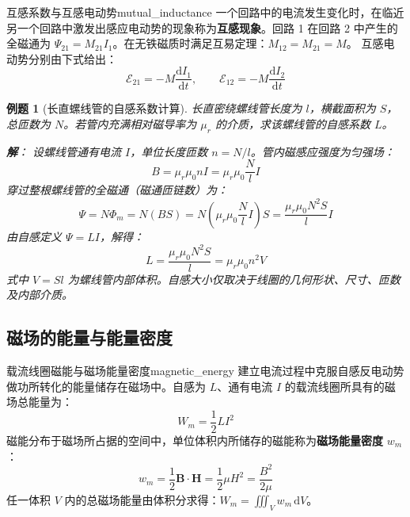 \documentclass[11pt,a4paper,fontset=fandol]{ctexart}
\newtheorem{example}{例题}[section]
\theoremstyle{remark}
\begin{document}
\begin{definition}{互感系数与互感电动势}{mutual_inductance}
一个回路中的电流发生变化时，在临近另一个回路中激发出感应电动势的现象称为\textbf{互感现象}。回路 1 在回路 2 中产生的全磁通为 $\Psi_{21} = M_{21} I_1$。在无铁磁质时满足互易定理：$M_{12} = M_{21} = M$。
互感电动势分别由下式给出：
\begin{equation}
    \mathcal{E}_{21} = -M \frac{\mathrm{d}I_1}{\mathrm{d}t}, \qquad \mathcal{E}_{12} = -M \frac{\mathrm{d}I_2}{\mathrm{d}t}
\end{equation}
\end{definition}

\begin{example}[长直螺线管的自感系数计算]
长直密绕螺线管长度为 $l$，横截面积为 $S$，总匝数为 $N$。若管内充满相对磁导率为 $\mu_r$ 的介质，求该螺线管的自感系数 $L$。

\textbf{解}：
设螺线管通有电流 $I$，单位长度匝数 $n = N/l$。管内磁感应强度为匀强场：
\begin{equation*}
    B = \mu_r \mu_0 n I = \mu_r \mu_0 \frac{N}{l} I
\end{equation*}
穿过整根螺线管的全磁通（磁通匝链数）为：
\begin{equation*}
    \Psi = N \Phi_m = N (B S) = N \left( \mu_r \mu_0 \frac{N}{l} I \right) S = \frac{\mu_r \mu_0 N^2 S}{l} I
\end{equation*}
由自感定义 $\Psi = LI$，解得：
\begin{equation}
    L = \frac{\mu_r \mu_0 N^2 S}{l} = \mu_r \mu_0 n^2 V
\end{equation}
式中 $V = Sl$ 为螺线管内部体积。自感大小仅取决于线圈的几何形状、尺寸、匝数及内部介质。
\end{example}

\subsection{磁场的能量与能量密度}

\begin{definition}{载流线圈磁能与磁场能量密度}{magnetic_energy}
建立电流过程中克服自感反电动势做功所转化的能量储存在磁场中。自感为 $L$、通有电流 $I$ 的载流线圈所具有的磁场总能量为：
\begin{equation}
    W_m = \frac{1}{2} L I^2
\end{equation}
磁能分布于磁场所占据的空间中，单位体积内所储存的磁能称为\textbf{磁场能量密度} $w_m$：
\begin{equation}
    w_m = \frac{1}{2}\bm{B} \cdot \bm{H} = \frac{1}{2}\mu H^2 = \frac{B^2}{2\mu}
\end{equation}
任一体积 $V$ 内的总磁场能量由体积分求得：$W_m = \iiint_V w_m\,\mathrm{d}V$。
\end{definition}
\end{document}
